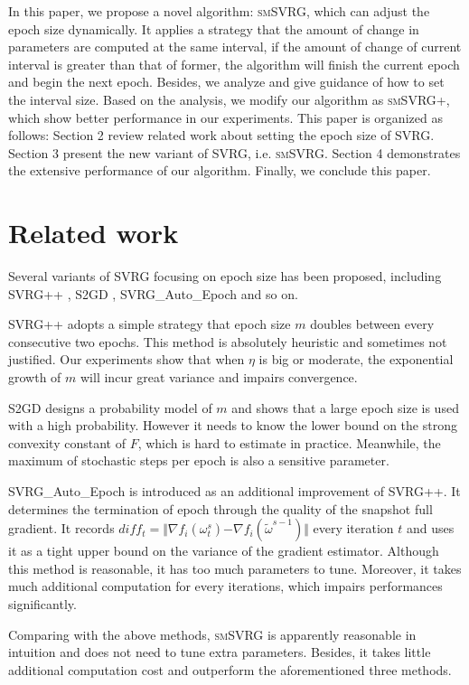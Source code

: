 \documentclass[conference]{IEEEtran}
\begin{document}
In this paper, we propose a novel algorithm: \textsc{smSVRG}, which can adjust the epoch size dynamically. It applies a strategy that the amount of change in parameters are computed at the same interval, if the amount of change of current interval is greater than that of former, the algorithm will finish the current epoch and begin the next epoch. Besides, we analyze and give guidance of how to set the interval size. Based on the analysis, we modify our algorithm as \textsc{smSVRG+}, which show better performance in our experiments. 
This paper is organized as follows: Section 2 review related work about setting the epoch size of SVRG. Section 3 present the new variant of SVRG, i.e. \textsc{smSVRG}. Section 4 demonstrates the extensive performance of our algorithm. Finally, we conclude this paper.



\section{Related work}
Several variants of SVRG focusing on epoch size has been proposed, including SVRG++ \citep{Allen2015Improved}, S2GD \citep{Richtarik:2013te}, SVRG\_Auto\_Epoch \citep{Allen2015Improved} and so on. 

SVRG++ adopts a simple strategy that epoch size $m$ doubles between every consecutive two epochs. This method is absolutely heuristic and sometimes not justified. Our experiments show that when $\eta$ is big or moderate, the exponential growth of $m$ will incur great variance and impairs convergence. 

S2GD designs a probability model of $m$ and shows that a large epoch size is used with a high probability. However it needs to know the lower bound on the strong convexity constant of $F$, which is hard to estimate in practice. Meanwhile, the maximum of stochastic steps per epoch is also a sensitive parameter.

SVRG\_Auto\_Epoch is introduced as an additional improvement of SVRG++. It determines the termination of epoch through the quality of the snapshot full gradient. It records $diff_t = \Vert\nabla f_{i}(\omega_t^s)\mathrm{-}\nabla f_{i}(\tilde{\omega}^{s-1})\Vert$ every iteration $t$ and uses it as a tight upper bound on the variance of the gradient estimator. Although this method is reasonable, it has too much parameters to tune. Moreover, it takes much additional computation for every iterations, which impairs performances significantly. 

Comparing with the above methods, \textsc{smSVRG} is apparently reasonable in intuition and does not need to tune extra parameters. Besides, it takes little additional computation cost and outperform the aforementioned three methods.
\end{document}
